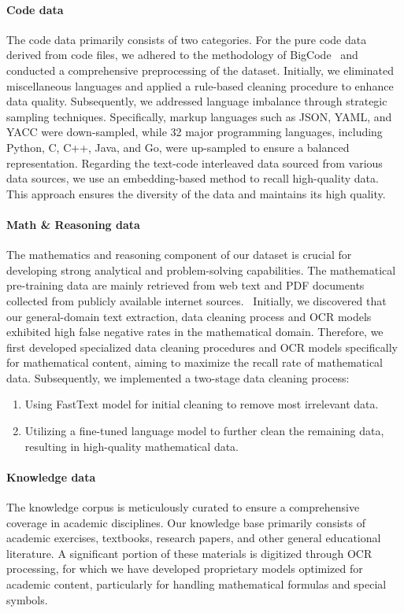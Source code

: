 \documentclass{article}
\newcommand{\citep}[1]{\parencite{#1}}
\begin{document}
\paragraph{Code data} The code data primarily consists of two categories. For the pure code data derived from code files, we adhered to the methodology of BigCode~\citep{li2023starcodersourceyou,lozhkov2024starcoder2stackv2} and conducted a comprehensive preprocessing of the dataset. Initially, we eliminated miscellaneous languages and applied a rule-based cleaning procedure to enhance data quality. Subsequently, we addressed language imbalance through strategic sampling techniques. Specifically, markup languages such as JSON, YAML, and YACC were down-sampled, while 32 major programming languages, including Python, C, C++, Java, and Go, were up-sampled to ensure a balanced representation. Regarding the text-code interleaved data sourced from various data sources, we use an embedding-based method to recall high-quality data. This approach ensures the diversity of the data and maintains its high quality.


\paragraph{Math \& Reasoning data} The mathematics and reasoning component of our dataset is crucial for developing strong analytical and problem-solving capabilities. 
The mathematical pre-training data are mainly retrieved from web text and PDF documents collected from publicly available internet sources.~\citep{paster2023openwebmath}
Initially, we discovered that our general-domain text extraction, data cleaning process and OCR models exhibited high false negative rates in the mathematical domain. Therefore, we first developed specialized data cleaning procedures and OCR models specifically for mathematical content, aiming to maximize the recall rate of mathematical data.
Subsequently, we implemented a two-stage data cleaning process: 
\begin{enumerate}
    \item Using FastText model for initial cleaning to remove most irrelevant data.
    \item Utilizing a fine-tuned language model to further clean the remaining data, resulting in high-quality mathematical data.
\end{enumerate}

\paragraph{Knowledge data} The knowledge corpus is meticulously curated to ensure a comprehensive coverage in academic disciplines. Our knowledge base primarily consists of academic exercises, textbooks, research papers, and other general educational literature. A significant portion of these materials is digitized through OCR processing, for which we have developed proprietary models optimized for academic content, particularly for handling mathematical formulas and special symbols.
\end{document}
